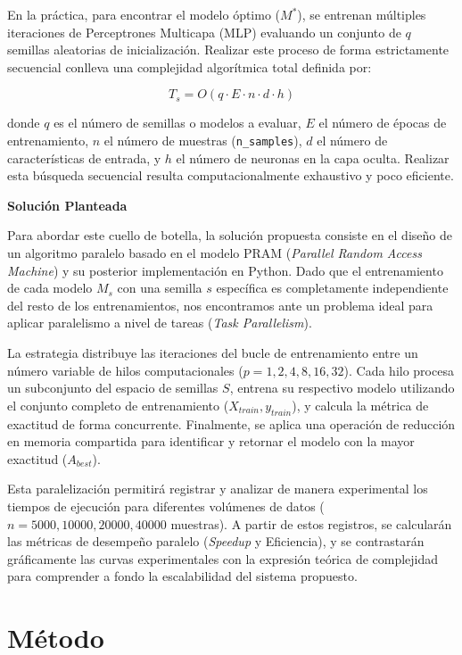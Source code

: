 \documentclass[11pt, a4paper]{article}
\begin{document}
En la práctica, para encontrar el modelo óptimo ($M^*$), se entrenan múltiples iteraciones de Perceptrones Multicapa (MLP) evaluando un conjunto de $q$ semillas aleatorias de inicialización. Realizar este proceso de forma estrictamente secuencial conlleva una complejidad algorítmica total definida por:

$$T_s = O(q \cdot E \cdot n \cdot d \cdot h)$$

\noindent donde $q$ es el número de semillas o modelos a evaluar, $E$ el número de épocas de entrenamiento, $n$ el número de muestras (\texttt{n\_samples}), $d$ el número de características de entrada, y $h$ el número de neuronas en la capa oculta. Realizar esta búsqueda secuencial resulta computacionalmente exhaustivo y poco eficiente.

\textbf{Solución Planteada}

Para abordar este cuello de botella, la solución propuesta consiste en el diseño de un algoritmo paralelo basado en el modelo PRAM (\textit{Parallel Random Access Machine}) y su posterior implementación en Python. Dado que el entrenamiento de cada modelo $M_s$ con una semilla $s$ específica es completamente independiente del resto de los entrenamientos, nos encontramos ante un problema ideal para aplicar paralelismo a nivel de tareas (\textit{Task Parallelism}). 

La estrategia distribuye las iteraciones del bucle de entrenamiento entre un número variable de hilos computacionales ($p = 1, 2, 4, 8, 16, 32$). Cada hilo procesa un subconjunto del espacio de semillas $S$, entrena su respectivo modelo utilizando el conjunto completo de entrenamiento ($X_{train}, y_{train}$), y calcula la métrica de exactitud de forma concurrente. Finalmente, se aplica una operación de reducción en memoria compartida para identificar y retornar el modelo con la mayor exactitud ($A_{best}$). 

Esta paralelización permitirá registrar y analizar de manera experimental los tiempos de ejecución para diferentes volúmenes de datos ($n = 5000, 10000, 20000, 40000$ muestras). A partir de estos registros, se calcularán las métricas de desempeño paralelo (\textit{Speedup} y Eficiencia), y se contrastarán gráficamente las curvas experimentales con la expresión teórica de complejidad para comprender a fondo la escalabilidad del sistema propuesto.

\section{Método}
\end{document}
